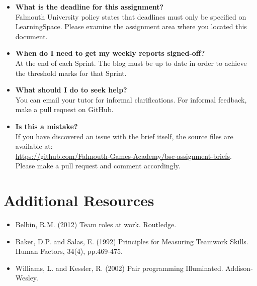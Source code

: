 \documentclass{../fal_assignment}
\begin{document}
\begin{itemize}
	\item 	\textbf{What is the deadline for this assignment?} \\ 
    		Falmouth University policy states that deadlines must only be specified on LearningSpace. Please examine the assignment area where you located this document.
    			    		
	\item 	\textbf{When do I need to get my weekly reports signed-off?} \\ 
    		At the end of each Sprint. The blog must be up to date in order to achieve the threshold marks for that Sprint.
    		
	\item 	\textbf{What should I do to seek help?} \\ 
    		You can email your tutor for informal clarifications. For informal feedback, make a pull request on GitHub. 
    		
    	\item 	\textbf{Is this a mistake?} \\ 	
    		If you have discovered an issue with the brief itself, the source files are available at: \\
    		\url{https://github.com/Falmouth-Games-Academy/bsc-assignment-briefs}.\\
    		 Please make a pull request and comment accordingly.
\end{itemize}

\section*{Additional Resources}

\begin{itemize}
    \item Belbin, R.M. (2012) Team roles at work. Routledge.
    \item Baker, D.P. and Salas, E. (1992) Principles for Measuring Teamwork Skills. Human Factors, 34(4), pp.469-475.
    \item Williams, L. and Kessler, R. (2002) Pair programming Illuminated. Addison-Wesley.
\end{itemize}
\end{document}
